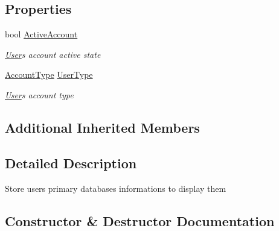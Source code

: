 \subsection*{Properties}
\begin{DoxyCompactItemize}
\item 
bool \mbox{\hyperlink{class_projet_banque_1_1_bank_user_infos_a365027011514ccd358ef49e03e2842be}{Active\+Account}}
\begin{DoxyCompactList}\small\item\em \mbox{\hyperlink{class_projet_banque_1_1_user}{User}}\textquotesingle{}s account active state \end{DoxyCompactList}\item 
\mbox{\hyperlink{class_projet_banque_1_1_user_a3ab673599238173c9d0ef40e731c0437}{Account\+Type}} \mbox{\hyperlink{class_projet_banque_1_1_bank_user_infos_a80c4bc1e63d3bbe33d1fcfa2d0096714}{User\+Type}}
\begin{DoxyCompactList}\small\item\em \mbox{\hyperlink{class_projet_banque_1_1_user}{User}}\textquotesingle{}s account type \end{DoxyCompactList}\end{DoxyCompactItemize}
\subsection*{Additional Inherited Members}


\subsection{Detailed Description}
Store user\textquotesingle{}s primary databases informations to display them 



\subsection{Constructor \& Destructor Documentation}
\mbox{\label{class_projet_banque_1_1_bank_user_infos_a5e06a09646d8feca1f40d7a9d706772d}} 
